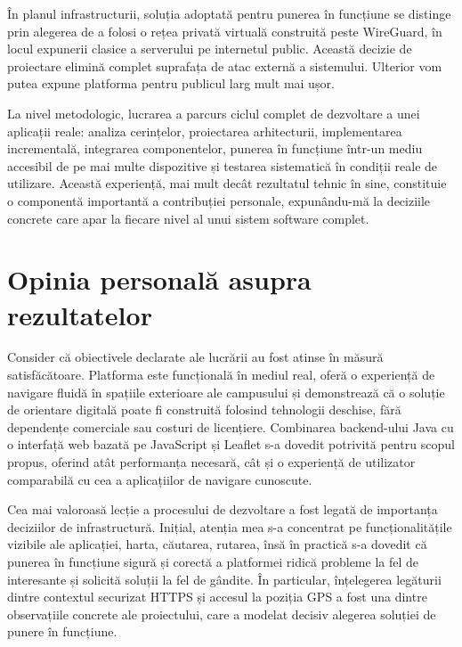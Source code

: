În planul infrastructurii, soluția adoptată pentru punerea în funcțiune se
distinge prin alegerea de a folosi o rețea privată virtuală construită peste
WireGuard, în locul expunerii clasice a serverului pe internetul public. Această
decizie de proiectare elimină complet suprafața de atac externă a sistemului. Ulterior vom putea 
expune platforma pentru publicul larg mult mai ușor.


La nivel metodologic, lucrarea a parcurs ciclul complet de dezvoltare a unei
aplicații reale: analiza cerințelor, proiectarea arhitecturii, implementarea
incrementală, integrarea componentelor, punerea în funcțiune într-un mediu
accesibil de pe mai multe dispozitive și testarea sistematică în condiții reale
de utilizare. Această experiență, mai mult decât rezultatul tehnic în sine,
constituie o componentă importantă a contribuției personale, expunându-mă la
deciziile concrete care apar la fiecare nivel al unui sistem software complet.


\newpage

\section*{Opinia personală asupra rezultatelor}

Consider că obiectivele declarate ale lucrării au fost atinse în măsură
satisfăcătoare. Platforma este funcțională în mediul real, oferă o experiență de
navigare fluidă în spațiile exterioare ale campusului și demonstrează că o
soluție de orientare digitală poate fi construită folosind tehnologii deschise,
fără dependențe comerciale sau costuri de licențiere. Combinarea backend-ului
Java cu o interfață web bazată pe JavaScript și Leaflet s-a dovedit potrivită
pentru scopul propus, oferind atât performanța necesară, cât și o experiență de
utilizator comparabilă cu cea a aplicațiilor de navigare cunoscute.

Cea mai valoroasă lecție a procesului de dezvoltare a fost legată de
importanța deciziilor de infrastructură. Inițial, atenția mea s-a concentrat pe
funcționalitățile vizibile ale aplicației, harta, căutarea, rutarea, însă în
practică s-a dovedit că punerea în funcțiune sigură și corectă a platformei
ridică probleme la fel de interesante și solicită soluții la fel de gândite. În
particular, înțelegerea legăturii dintre contextul securizat HTTPS și accesul la
poziția GPS a fost una dintre observațiile concrete ale proiectului, care a
modelat decisiv alegerea soluției de punere în funcțiune.

